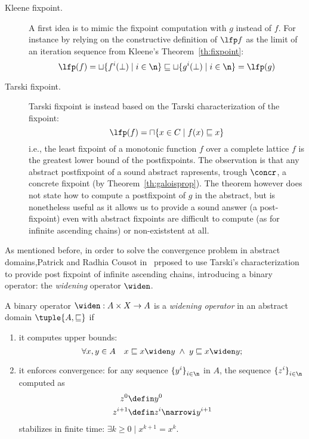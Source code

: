 \begin{description}
\item[Kleene fixpoint.] A first idea is to mimic the fixpoint
  computation with \(g\) instead of \(f\). For instance by relying on
  the constructive definition of \(\lfp f\) as the limit of an
  iteration sequence from Kleene's Theorem~\ref{th:fixpoint}:
  \begin{equation*}
    \lfp(f) = \sqcup\{f^i(\bot) \mid i \in \n\} \sqsubseteq \sqcup\{g^i(\bot) \mid i \in \n\} = \lfp(g)
  \end{equation*}
  
\item[Tarski fixpoint.] Tarski fixpoint is instead based on the Tarski
  characterization of the fixpoint:
  \begin{equation}\label{eq:tarski}
    \lfp(f) = \sqcap \{x \in C \mid f(x) \sqsubseteq x\}
  \end{equation}
  i.e., the least fixpoint of a monotonic function \(f\) over a
  complete lattice \(f\) is the greatest lower bound of the
  postfixpoints.  The observation is that any abstract postfixpoint of
  a sound abstract rapresents, trough \(\concr\), a concrete fixpoint
  (by Theorem~\ref{th:galoisprop}). The theorem however does not state
  how to compute a postfixpoint of \(g\) in the abstract, but is
  nonetheless useful as it allows us to provide a sound answer (a
  post-fixpoint) even with abstract fixpoints are difficult to compute
  (as for infinite ascending chains) or non-existstent at all.
\end{description}

As mentioned before, in order to solve the convergence problem in
abstract domains,Patrick and Radhia Cousot in~\cite{patrickradhia:one}
prposed to use Tarski's characterization to provide post fixpoint of
infinite ascending chains, introducing a binary operator: the
\emph{widening} operator \(\widen\).

\begin{definition}\label{def:widen}
  A binary operator \(\widen : A \times X \to A\) is a \emph{widening
    operator} in an abstract domain \(\tuple{A, \sqsubseteq}\) if
  \begin{enumerate}
  \item it computes upper bounds:
    \begin{equation*}
      \forall x, y \in A \quad x \sqsubseteq x \widen y \; \land \; y \sqsubseteq x \widen y;
    \end{equation*}
  \item\label{widen:prop1} it enforces convergence: for any sequence
    \({\{y^i\}}_{i\in\n}\) in \(A\), the sequence
    \({\{z^i\}}_{i\in\n}\) computed as
    \begin{align*}
      z^0 & \defin y^0 \\
      z^{i+1} & \defin z^i \narrowi y^{i+1}
    \end{align*}
    stabilizes in finite time: \(\exists k \geq 0 \mid x^{k+1} = x^k\).
  \end{enumerate}
\end{definition}

